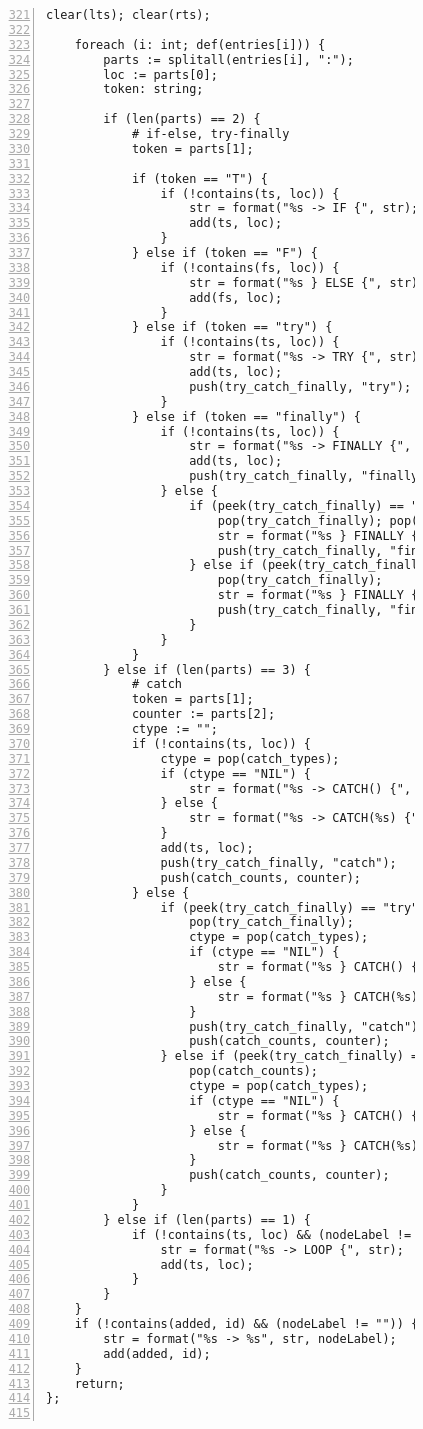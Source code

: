 \begin{figure}[ht!]
\begin{lstlisting}[numbers=left, tabsize=4, escapechar=@, caption={API Usage Mining Analysis},label={lst:aun-code},  firstline = 321, firstnumber = 321, lastline = 381]
	clear(lts); clear(rts);
		
	foreach (i: int; def(entries[i])) {
		parts := splitall(entries[i], ":");
		loc := parts[0];
		token: string;
		
		if (len(parts) == 2) {
			# if-else, try-finally
			token = parts[1];
				
			if (token == "T") {
				if (!contains(ts, loc)) {
					str = format("%s -> IF {", str);
					add(ts, loc);
				}
			} else if (token == "F") {
				if (!contains(fs, loc)) {
					str = format("%s } ELSE {", str);
					add(fs, loc); 
				}
			} else if (token == "try") {
				if (!contains(ts, loc)) {
					str = format("%s -> TRY {", str);
					add(ts, loc);
					push(try_catch_finally, "try");
				}
			} else if (token == "finally") {
				if (!contains(ts, loc)) {
					str = format("%s -> FINALLY {", str);
					add(ts, loc);
					push(try_catch_finally, "finally");
				} else {
					if (peek(try_catch_finally) == "catch") {
						pop(try_catch_finally); pop(catch_counts);
						str = format("%s } FINALLY {", str);
						push(try_catch_finally, "finally");
					} else if (peek(try_catch_finally) == "try") {
					    pop(try_catch_finally);
					    str = format("%s } FINALLY {", str);
					    push(try_catch_finally, "finally");
					}
				}
			} 
		} else if (len(parts) == 3) {
			# catch
			token = parts[1];
			counter := parts[2];
			ctype := "";
			if (!contains(ts, loc)) {
			    ctype = pop(catch_types);
			    if (ctype == "NIL") {
				    str = format("%s -> CATCH() {", str);
			    } else {
			        str = format("%s -> CATCH(%s) {", str, ctype);
			    }
				add(ts, loc);
				push(try_catch_finally, "catch");
				push(catch_counts, counter);
			} else {
				if (peek(try_catch_finally) == "try") {
					pop(try_catch_finally);
					ctype = pop(catch_types);
			        if (ctype == "NIL") {
			            str = format("%s } CATCH() {", str);    
			        } else {
			            str = format("%s } CATCH(%s) {", str, ctype);    
			        }
					push(try_catch_finally, "catch");
					push(catch_counts, counter);
				} else if (peek(try_catch_finally) == "catch" && peek(catch_counts) != counter) {
					pop(catch_counts);
					ctype = pop(catch_types);
			        if (ctype == "NIL") {
			            str = format("%s } CATCH() {", str);    
			        } else {
			            str = format("%s } CATCH(%s) {", str, ctype);    
			        }
					push(catch_counts, counter);
				}
			}
		} else if (len(parts) == 1) {
			if (!contains(ts, loc) && (nodeLabel != "")) {
				str = format("%s -> LOOP {", str);
				add(ts, loc);
			}
		} 
	}
	if (!contains(added, id) && (nodeLabel != "")) {
        str = format("%s -> %s", str, nodeLabel);
        add(added, id);
    }
	return;
};


\end{lstlisting}
\end{figure}
